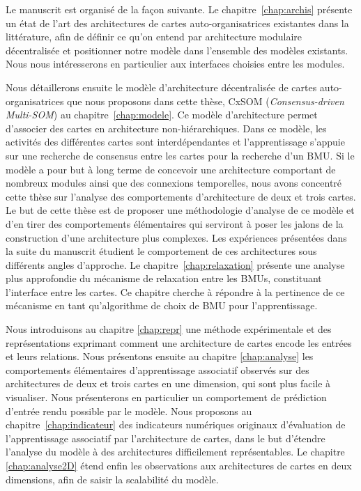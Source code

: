 Le manuscrit est organisé de la façon suivante.
Le chapitre~\ref{chap:archis} présente un état de l'art des architectures de cartes auto-organisatrices existantes dans la littérature, afin de définir ce qu'on entend par architecture modulaire décentralisée et positionner notre modèle dans l'ensemble des modèles existants. Nous nous intéresserons en particulier aux interfaces choisies entre les modules.

Nous détaillerons ensuite le modèle d'architecture décentralisée de cartes auto-organisatrices que nous proposons dans cette thèse, CxSOM (\emph{Consensus-driven Multi-SOM}) au chapitre~\ref{chap:modele}.
Ce modèle d'architecture permet d'associer des cartes en architecture non-hiérarchiques. Dans ce modèle, les activités des différentes cartes sont interdépendantes et l'apprentissage s'appuie sur une recherche de consensus entre les cartes pour la recherche d'un BMU.
Si le modèle a pour but à long terme de concevoir une architecture comportant de nombreux modules ainsi que des connexions temporelles, nous avons concentré cette thèse sur l'analyse des comportements d'architecture de deux et trois cartes.
Le but de cette thèse est de proposer une méthodologie d'analyse de ce modèle et d'en tirer des comportements élémentaires qui serviront à poser les jalons de la construction d'une architecture plus complexes.
Les expériences présentées dans la suite du manuscrit étudient le comportement de ces architectures sous différents angles d'approche.
Le chapitre~\ref{chap:relaxation} présente une analyse plus approfondie du mécanisme de relaxation entre les BMUs, constituant l'interface entre les cartes. 
Ce chapitre cherche à répondre à la pertinence de ce mécanisme en tant qu'algorithme de choix de BMU pour l'apprentissage.

Nous introduisons au chapitre \ref{chap:repr} une méthode expérimentale et des représentations exprimant comment une architecture de cartes encode les entrées et leurs relations.
Nous présentons ensuite au chapitre \ref{chap:analyse} les comportements élémentaires d'apprentissage associatif observés sur des architectures de deux et trois cartes en une dimension, qui sont plus facile à visualiser. 
Nous présenterons en particulier un comportement de prédiction d'entrée rendu possible par le modèle.
Nous proposons au chapitre~\ref{chap:indicateur} des indicateurs numériques originaux d'évaluation de l'apprentissage associatif par l'architecture de cartes, dans le but d'étendre l'analyse du modèle à des architectures difficilement représentables.
Le chapitre \ref{chap:analyse2D} étend enfin les observations aux architectures de cartes en deux dimensions, afin de saisir la scalabilité du modèle.

